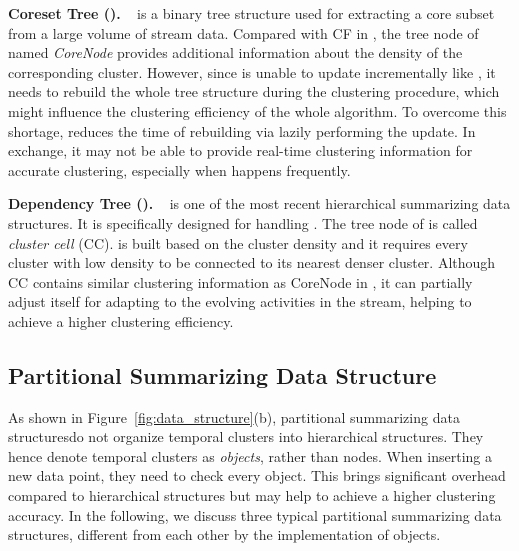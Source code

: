 \textbf{Coreset Tree (\CoreT).}
\label{subsec:CT}
\CoreT~\cite{StreamKM++:12} is a binary tree structure used for extracting a core subset from a large volume of stream data. Compared with CF in \CFT, the tree node of \CoreT named \emph{CoreNode} provides additional information about the density of the corresponding cluster. However, since \CoreT is unable to update incrementally like \CFT, it needs to rebuild the whole tree structure during the clustering procedure, which might influence the clustering efficiency of the whole algorithm. To overcome this shortage, \CoreT reduces the time of rebuilding via lazily performing the update. In exchange, it may not be able to provide real-time clustering information for accurate clustering, especially when \cef happens frequently.

\textbf{Dependency Tree (\DPT).}
\label{subsec:DPT}
\DPT~\cite{EDMStream:17} is one of the most recent hierarchical summarizing data structures. It is specifically designed for handling \cef.
The tree node of \DPT is called \emph{cluster cell} (CC).
\DPT is built based on the cluster density and it requires every cluster with low density to be connected to its nearest denser cluster. Although CC contains similar clustering information as CoreNode in \CoreT, it can partially adjust itself for adapting to the evolving activities in the stream, helping to achieve a higher clustering efficiency.

\subcompact
\subsection{Partitional Summarizing Data Structure}
\label{subsec:partition}
As shown in Figure~\ref{fig:data_structure}(b), partitional
summarizing data structuresdo not organize temporal clusters into hierarchical structures. They hence denote temporal clusters as \emph{objects}, rather than nodes.
When inserting a new data point, they need to check every object. This brings significant overhead compared to hierarchical structures but may help to achieve a higher clustering accuracy.
In the following, we discuss three typical partitional summarizing data structures, different from each other by the implementation of objects.


